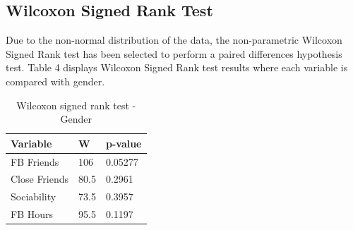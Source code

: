 
\subsection{Wilcoxon Signed Rank Test}


Due to the non-normal distribution of the data, the non-parametric Wilcoxon Signed Rank test has been selected to perform a paired differences hypothesis test. Table 4 displays Wilcoxon Signed Rank test results where each variable is compared with gender.


\begin{table}[H]
\centering
\caption{Wilcoxon signed rank test - Gender}
\begin{tabular}{l|l|l}
Variable      & W    & p-value \\ \hline
FB Friends    & 106  & 0.05277 \\ \hline
Close Friends & 80.5 & 0.2961  \\ \hline
Sociability   & 73.5 & 0.3957  \\ \hline
FB Hours      & 95.5 & 0.1197  \\ \hline
\end{tabular}
\end{table}
